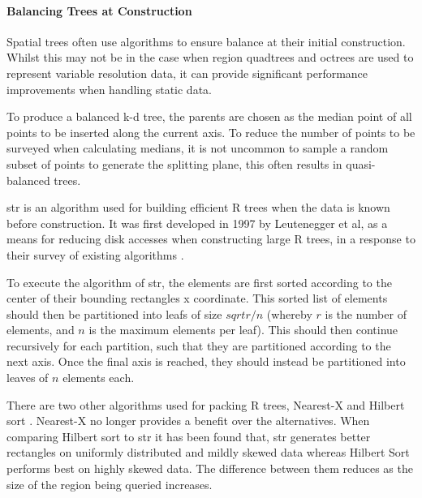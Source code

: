       \paragraph*{Balancing Trees at Construction}
        Spatial trees often use algorithms to ensure balance at their initial construction. Whilst this may not be in the case when region quadtrees and octrees are used to represent variable resolution data, it can provide significant performance improvements when handling static data.
        
        To produce a balanced k-d tree, the parents are chosen as the median point of all points to be inserted along the current axis. To reduce the number of points to be surveyed when calculating medians, it is not uncommon to sample a random subset of points to generate the splitting plane, this often results in quasi-balanced trees.
        
        \gls{str} is an algorithm used for building efficient R trees when the data is known before construction. It was first developed in 1997 by Leutenegger et al, as a means for reducing disk accesses when constructing large R trees, in a response to their survey of existing algorithms \cite{LL*97}.
        
        To execute the algorithm of \gls{str}, the elements are first sorted according to the center of their bounding rectangles x coordinate. This sorted list of elements should then be partitioned into leafs of size $sqrt{r/n}$ (whereby $r$ is the number of elements, and $n$ is the maximum elements per leaf). This should then continue recursively for each partition, such that they are partitioned according to the next axis. Once the final axis is reached, they should instead be partitioned into leaves of $n$ elements each.
        
        There are two other algorithms used for packing R trees, Nearest-X and Hilbert sort \cite{KF93}. Nearest-X no longer provides a benefit over the alternatives. When comparing Hilbert sort to \gls{str} it has been found that, \gls{str} generates better rectangles on uniformly distributed and mildly skewed data whereas Hilbert Sort performs best on highly skewed data. The difference between them reduces as the size of the region being queried increases.
    
